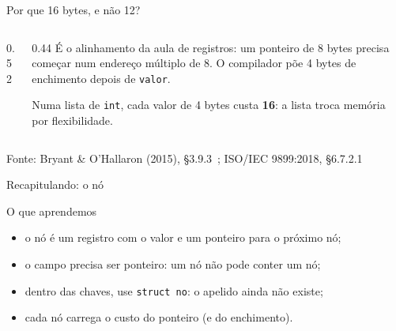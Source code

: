 \documentclass[aspectratio=169]{beamer}
\newcommand{\fonte}[1]{\vfill\hfill{\scriptsize\textcolor{UFSGray}{Fonte: #1}}}
\begin{document}
\begin{frame}{Por que 16 bytes, e não 12?}
  \begin{columns}[c]
    \begin{column}{0.52\textwidth}
      \begin{center}
      \end{center}
    \end{column}
    \begin{column}{0.44\textwidth}
      \small
      É o alinhamento da aula de registros: um ponteiro de 8 bytes precisa
      começar num endereço múltiplo de 8. O compilador põe 4 bytes de
      enchimento depois de \texttt{valor}.

      \medskip
      Numa lista de \texttt{int}, cada valor de 4 bytes custa
      \textbf{16}: a lista troca memória por flexibilidade.
    \end{column}
  \end{columns}
  \fonte{Bryant \& O'Hallaron (2015), §3.9.3~\cite{bryant2015computer};
    ISO/IEC 9899:2018, §6.7.2.1~\cite{iso2018c17}}
\end{frame}

\begin{frame}{Recapitulando: o nó}
  \begin{block}{O que aprendemos}
    \begin{itemize}
      \item o nó é um registro com o valor e um ponteiro para o próximo nó;
      \item o campo precisa ser ponteiro: um nó não pode conter um nó;
      \item dentro das chaves, use \texttt{struct no}: o apelido ainda não
        existe;
      \item cada nó carrega o custo do ponteiro (e do enchimento).
    \end{itemize}
  \end{block}
\end{frame}
\end{document}
